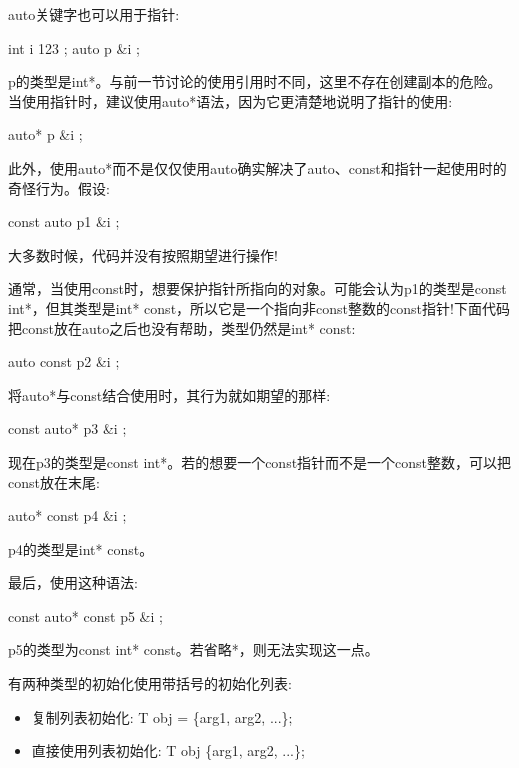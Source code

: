 auto关键字也可以用于指针:

\begin{cpp}
int i { 123 };
auto p { &i };
\end{cpp}

p的类型是int*。与前一节讨论的使用引用时不同，这里不存在创建副本的危险。当使用指针时，建议使用auto*语法，因为它更清楚地说明了指针的使用:

\begin{cpp}
auto* p { &i };
\end{cpp}

此外，使用auto*而不是仅仅使用auto确实解决了auto、const和指针一起使用时的奇怪行为。假设:

\begin{cpp}
const auto p1 { &i };
\end{cpp}

大多数时候，代码并没有按照期望进行操作!

通常，当使用const时，想要保护指针所指向的对象。可能会认为p1的类型是const int*，但其类型是int* const，所以它是一个指向非const整数的const指针!下面代码把const放在auto之后也没有帮助，类型仍然是int* const:

\begin{cpp}
auto const p2 { &i };
\end{cpp}

将auto*与const结合使用时，其行为就如期望的那样:

\begin{cpp}
const auto* p3 { &i };
\end{cpp}

现在p3的类型是const int*。若的想要一个const指针而不是一个const整数，可以把const放在末尾:

\begin{cpp}
auto* const p4 { &i };
\end{cpp}

p4的类型是int* const。

最后，使用这种语法:

\begin{cpp}
const auto* const p5 { &i };
\end{cpp}

p5的类型为const int* const。若省略*，则无法实现这一点。


有两种类型的初始化使用带括号的初始化列表:

\begin{itemize}
\item
复制列表初始化: T obj = \{arg1, arg2, ...\};

\item
直接使用列表初始化: T obj \{arg1, arg2, ...\};
\end{itemize}


